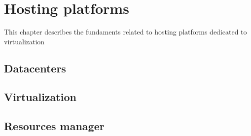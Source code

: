 \chapter{Hosting platforms}
\label{ch: hosting platforms}

This chapter describes the fundaments related to hosting platforms dedicated to virtualization

\section{Datacenters}

\section{Virtualization}

\section{Resources manager}
